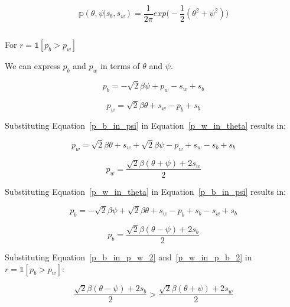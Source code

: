 \documentclass[a4paper,11pt]{article}
\theoremstyle{mytheor}
\begin{document}
\begin{equation}
    \label{p_psi_theta}
    \mathbb{p}(\theta,\psi|s_b,s_w)= \frac{1}{2\pi}exp \Big( -\frac{1}{2}(\theta^2+\psi^2) \Big)
\end{equation}

\subsection{}
For $r= \mathbb{1}[p_b > p_w]$

We can express $p_b$ and $p_w$ in terms of $\theta$ and $\psi$.

\begin{equation}
    \label{p_b_in_psi}
    p_b = -\sqrt{2}\beta\psi + p_w - s_w + s_b
\end{equation}

\begin{equation}
    \label{p_w_in_theta}
    p_w = \sqrt{2}\beta\theta + s_w - p_b + s_b
\end{equation}

Substituting Equation~\ref{p_b_in_psi} in Equation~\ref{p_w_in_theta} results in:

\begin{equation}
    \label{p_b_in_p_w}
    p_w = \sqrt{2}\beta\theta + s_w + \sqrt{2}\beta\psi - p_w + s_w - s_b + s_b
\end{equation}

\begin{equation}
    \label{p_b_in_p_w_2}
    p_w = \frac{\sqrt{2}\beta(\theta+\psi) + 2s_w}{2}
\end{equation}

Substituting Equation~\ref{p_w_in_theta} in Equation~\ref{p_b_in_psi} results in:

\begin{equation}
    \label{p_w_in_p_b}
    p_b = -\sqrt{2}\beta\psi + \sqrt{2}\beta\theta + s_w - p_b + s_b - s_w + s_b
\end{equation}

\begin{equation}
    \label{p_w_in_p_b_2}
    p_b = \frac{\sqrt{2}\beta(\theta-\psi) + 2s_b}{2}
\end{equation}

Substituting Equation~\ref{p_b_in_p_w_2} and~\ref{p_w_in_p_b_2} in $r= \mathbb{1}[p_b > p_w]$:

\begin{equation}
    \label{p_w_and_p_b_in_r}
    \frac{\sqrt{2}\beta(\theta-\psi) + 2s_b}{2} > \frac{\sqrt{2}\beta(\theta+\psi) + 2s_w}{2}
\end{equation}
\end{document}
